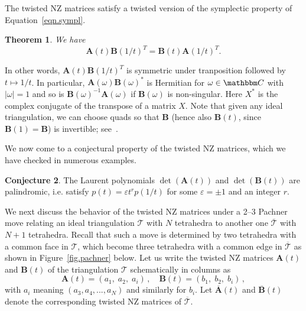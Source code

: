 \documentclass[12pt,reqno]{amsart}
\newtheorem{theorem}{Theorem}[section]
\theoremstyle{definition}
\newtheorem{conjecture}[theorem]{Conjecture}
\def\BC{\mathbbm C}
\def\calT{\mathcal T}
\def\ve{\varepsilon}
\def\be{\begin{equation}}
\def\ee{\end{equation}}
\begin{document}
The twisted NZ matrices satisfy a twisted version of the symplectic
property of Equation~\eqref{eqn.sympl}.

\begin{theorem}
\label{thm.sympl}
We have
\be 
\label{eqn.abba}
\mathbf{A}(t) \mathbf{B}(1/t)^T = \mathbf{B}(t) \mathbf{A}(1/t)^T. 
\ee
\end{theorem}
In other words, $\mathbf{A}(t) \mathbf{B}(1/t)^T$ is symmetric under tranposition
followed by $t \mapsto 1/t$.
In particular, $\mathbf{A}(\omega) \mathbf{B}(\omega)^\ast$ is Hermitian for
$\omega \in \BC$ with $|\omega|=1$
and so is $\mathbf{B}(\omega)^{-1}\mathbf{A}(\omega)$ if $\mathbf{B}(\omega)$
is non-singular.
Here  $X^\ast$ is
the complex conjugate of the transpose of a matrix $X$.
 Note that given any ideal triangulation, we can choose quads
so that $\mathbf{B}$ (hence also $\mathbf{B}(t)$, since $\mathbf{B}(1)=\mathbf{B}$)
is invertible; see~\cite[App.A]{DG1}.

We now come to a conjectural property of the twisted NZ
matrices, which we have checked in numerous examples.

\begin{conjecture}
\label{conj.ABt}
The Laurent polynomials $\det(\mathbf{A}(t))$ and $\det(\mathbf{B}(t))$ are palindromic,
i.e. satisfy $p(t)=\ve t^r p(1/t)$ for some $\ve = \pm1$ and an integer $r$. 
\end{conjecture}

We next discuss the behavior of the twisted NZ matrices under a 2--3 Pachner move
relating an ideal triangulation $\calT$ with $N$ tetrahedra to another one
$\overline{\calT}$ with $N+1$ tetrahedra.  
Recall that such a move is determined by two tetrahedra with a common face in $\calT$,
which become three tetrahedra with a common edge in $\overline{\calT}$ as shown in
Figure~\ref{fig.pachner} below. Let us write the twisted NZ matrices $\mathbf{A}(t)$ and
$\mathbf{B}(t)$ of the triangulation $\calT$ schematically in columns as
\be 
\mathbf{A}(t) = (a_1,\;a_2,\;a_i)\,,\quad \mathbf{B}(t) = (b_1,\;b_2,\;b_i)\,, 
\ee
with $a_i$ meaning $(a_3,a_4,...,a_N)$ and similarly for $b_i$.
Let $\overline{\mathbf{A}}(t)$ and $\overline{\mathbf{B}}(t)$ denote
the corresponding twisted NZ matrices of $\overline{\calT}$.

\end{document}
